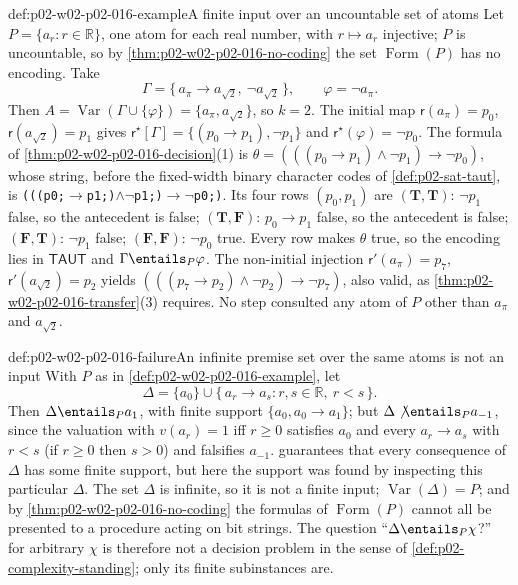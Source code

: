 \begin{hbexample}{def:p02-w02-p02-016-example}{A finite input over an uncountable set of atoms}
Let \(P=\{a_r:r\in\mathbb R\}\), one atom for each real number, with
\(r\mapsto a_r\) injective; \(P\) is uncountable, so by
\cref{thm:p02-w02-p02-016-no-coding} the set \(\operatorname{Form}(P)\) has no
encoding.  Take
\[
 \Gamma=\{\,a_\pi\to a_{\sqrt2},\ \neg a_{\sqrt2}\,\},\qquad
 \varphi=\neg a_\pi .
\]
Then \(A=\operatorname{Var}(\Gamma\cup\{\varphi\})=\{a_\pi,a_{\sqrt2}\}\), so
\(k=2\).  The initial map \(\mathsf r(a_\pi)=p_0\), \(\mathsf r(a_{\sqrt2})=p_1\)
gives \(\mathsf r^{\star}[\Gamma]=\{(p_0\to p_1),\neg p_1\}\) and
\(\mathsf r^{\star}(\varphi)=\neg p_0\).  The formula of
\cref{thm:p02-w02-p02-016-decision}(1) is
\(\theta=(((p_0\to p_1)\land\neg p_1)\to\neg p_0)\), whose string, before the
fixed-width binary character codes of \cref{def:p02-sat-taut}, is
\texttt{(((p0;}\(\to\)\texttt{p1;)}\(\land\neg\)\texttt{p1;)}\(\to\neg\)\texttt{p0;)}.
Its four rows \((p_0,p_1)\) are
\((\mathbf T,\mathbf T)\): \(\neg p_1\) false, so the antecedent is false;
\((\mathbf T,\mathbf F)\): \(p_0\to p_1\) false, so the antecedent is false;
\((\mathbf F,\mathbf T)\): \(\neg p_1\) false;
\((\mathbf F,\mathbf F)\): \(\neg p_0\) true.
Every row makes \(\theta\) true, so the encoding lies in \(\mathsf{TAUT}\) and
\(\Gamma\entails_P\varphi\).  The non-initial injection
\(\mathsf r'(a_\pi)=p_7\), \(\mathsf r'(a_{\sqrt2})=p_2\) yields
\((((p_7\to p_2)\land\neg p_2)\to\neg p_7)\), also valid, as
\cref{thm:p02-w02-p02-016-transfer}(3) requires.  No step consulted any atom
of \(P\) other than \(a_\pi\) and \(a_{\sqrt2}\).
\end{hbexample}

\begin{hbwarning}{def:p02-w02-p02-016-failure}{An infinite premise set over the same atoms is not an input}
With \(P\) as in \cref{def:p02-w02-p02-016-example}, let
\[
 \Delta=\{a_0\}\cup\{\,a_r\to a_s : r,s\in\mathbb R,\ r<s\,\}.
\]
Then \(\Delta\entails_P a_1\), with finite support \(\{a_0,a_0\to a_1\}\);
but \(\Delta\not\entails_P a_{-1}\), since the valuation with
\(v(a_r)=1\) iff \(r\ge 0\) satisfies \(a_0\) and every \(a_r\to a_s\) with
\(r<s\) (if \(r\ge0\) then \(s>0\)) and falsifies \(a_{-1}\).
 guarantees that every consequence of
\(\Delta\) has some finite support, but here the support was found by
inspecting this particular \(\Delta\).  The set \(\Delta\) is infinite,
so it is not a finite input; \(\operatorname{Var}(\Delta)=P\); and by
\cref{thm:p02-w02-p02-016-no-coding} the formulas of
\(\operatorname{Form}(P)\) cannot all be presented to a procedure acting on
bit strings.  The question ``\(\Delta\entails_P\chi\)?'' for arbitrary \(\chi\)
is therefore not a decision problem in the sense of
\cref{def:p02-complexity-standing}; only its finite subinstances are.
\end{hbwarning}


